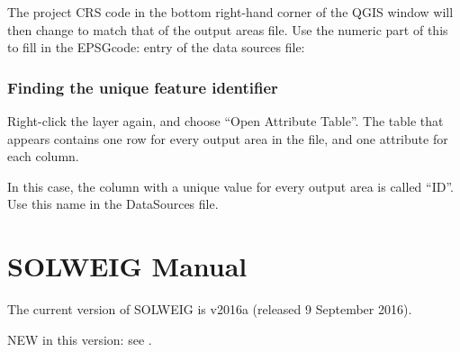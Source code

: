 \documentclass[letterpaper,10pt,english]{sphinxmanual}
\begin{document}
\begin{figure}[htbp]
\centering
\capstart

\noindent{}
\caption{}\label{\detokenize{OtherManuals/LQF_Manual:id11}}\end{figure}

The
project CRS code in the bottom right-hand corner of the QGIS window will
then change to match that of the output areas file. Use the numeric part
of this to fill in the EPSGcode: entry of the data sources file:

\begin{figure}[htbp]
\centering
\capstart

\noindent{}
\caption{}\label{\detokenize{OtherManuals/LQF_Manual:id12}}\end{figure}


\subsubsection{Finding the unique feature identifier}
\label{\detokenize{OtherManuals/LQF_Manual:finding-the-unique-feature-identifier}}
Right-click the layer again, and choose “Open Attribute Table”. The
table that appears contains one row for every output area in the file,
and one attribute for each column.

\begin{figure}[htbp]
\centering
\capstart

\noindent{}
\caption{}\label{\detokenize{OtherManuals/LQF_Manual:id13}}\end{figure}

In this case, the column with a unique value for every output area is
called “ID”. Use this name in the DataSources file.


\section{SOLWEIG Manual}
\label{\detokenize{OtherManuals/SOLWEIG:solweig-manual}}\label{\detokenize{OtherManuals/SOLWEIG:solweigmanual}}\label{\detokenize{OtherManuals/SOLWEIG::doc}}
The current version of SOLWEIG is v2016a (released 9 September 2016).

NEW in this version: see {\hyperref[\detokenize{OtherManuals/SOLWEIG:version-history}]{}}.
\end{document}

